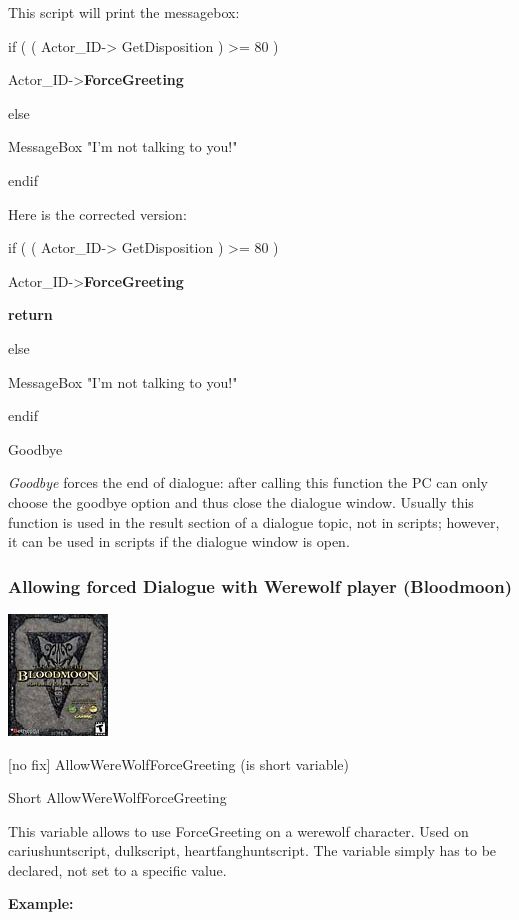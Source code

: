 This script will print the messagebox:

if ( ( Actor\_ID-> GetDisposition ) >= 80 )

Actor\_ID->\textbf{ForceGreeting}

else

MessageBox "I'm not talking to you!"

endif

Here is the corrected version:

if ( ( Actor\_ID-> GetDisposition ) >= 80 )

Actor\_ID->\textbf{ForceGreeting~}

\textbf{return}

else

MessageBox "I'm not talking to you!"

endif

Goodbye

\emph{Goodbye} forces the end of dialogue: after calling this function
the PC can only choose the goodbye option and thus close the dialogue
window. Usually this function is used in the result section of a
dialogue topic, not in scripts; however, it can be used in scripts if
the dialogue window is open.

\hypertarget{allowing-forced-dialogue-with-werewolf-player-bloodmoon}{%
\subsubsection{Allowing forced Dialogue with Werewolf player
(Bloodmoon)}\label{allowing-forced-dialogue-with-werewolf-player-bloodmoon}}

\includegraphics{media/image7.png}

{[}no fix{]} AllowWereWolfForceGreeting (is short variable)

Short AllowWereWolfForceGreeting

This variable allows to use ForceGreeting on a werewolf character. Used
on cariushuntscript, dulkscript, heartfanghuntscript. The variable
simply has to be declared, not set to a specific value.

\textbf{Example:}



